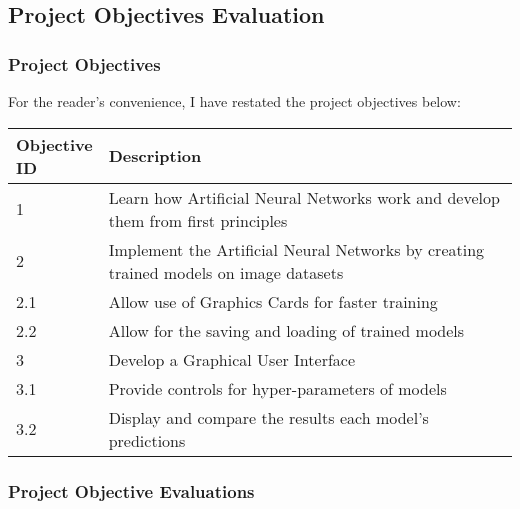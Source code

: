 \documentclass[./project-report/src/latex/project-report.tex]{subfiles}
\begin{document}
\subsection{Project Objectives Evaluation}

\subsubsection{Project Objectives}

For the reader's convenience, I have restated the project objectives below:
\vspace{5mm}

\noindent\begin{tabular}{|p{0.13\linewidth}|p{0.87\linewidth}|}
    \hline
    \textbf{Objective ID} & \textbf{Description} \\
    \hline
    1 & Learn how Artificial Neural Networks work and develop them from first principles \\
    \hline
    2 & Implement the Artificial Neural Networks by creating trained models on image datasets \\
    \hline
    2.1 & Allow use of Graphics Cards for faster training \\
    \hline
    2.2 & Allow for the saving and loading of trained models \\
    \hline
    3 & Develop a Graphical User Interface \\
    \hline
    3.1 & Provide controls for hyper-parameters of models \\
    \hline
    3.2 & Display and compare the results each model's predictions \\
    \hline
\end{tabular}

\subsubsection{Project Objective Evaluations}
\end{document}
